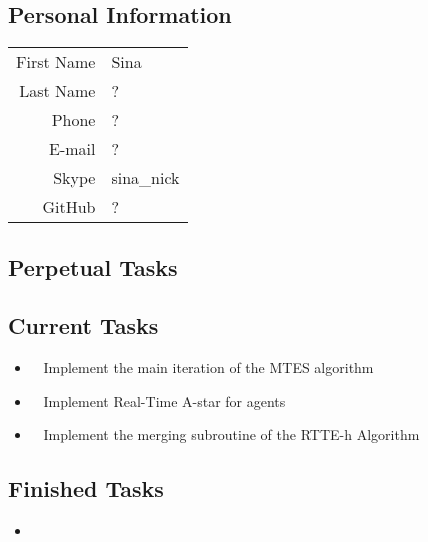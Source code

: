 \subsection{Personal Information}
\begin{table}[h!]
	\begin{tabular}{rl}
	First Name 	& Sina\\
	Last Name	& ?\\
	Phone		& ?\\
	E-mail		& ?\\
	Skype		& sina\_nick\\
	GitHub		& ?
\end{tabular}
\end{table}

\subsection{Perpetual Tasks}

\subsection{Current Tasks}
\begin{itemize}
	\item~
	Implement the main iteration of the MTES algorithm
	\item~
	Implement Real-Time A-star for agents
	\item~
	Implement the merging subroutine of the RTTE-h Algorithm
\end{itemize}

\subsection{Finished Tasks}
\begin{itemize}
	\item 
\end{itemize}